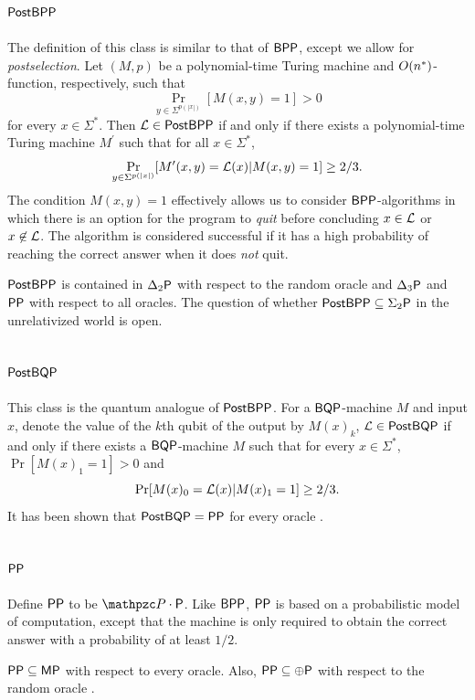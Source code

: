 \subsection{$\mathsf{PostBPP}$}

The definition of this class is similar to that of $\mathsf{BPP}$, except we allow 
for \textit{postselection}. Let $(M,p)$ be a polynomial-time Turing machine and 
$O(n^*)$-function, respectively,  such that
\[
\Pr_{y\in\Sigma^{p(|x|)}}[M(x,y)=1]>0
\]
for every $x\in\Sigma^*$. Then $\mathcal{L}\in\mathsf{PostBPP}$ if and only if there exists
a polynomial-time Turing machine $M^\prime$ such that for all $x\in\Sigma^*$,
\[
\Pr_{y\in\Sigma^{p(|x|)}}[M^\prime(x,y)=\mathcal{L}(x)|M(x,y)=1]\geq 2/3.
\]
The condition $M(x,y)=1$ effectively allows us to consider 
$\mathsf{BPP}$-algorithms in which there is an option for the program to 
\textit{quit} before concluding $x\in\mathcal{L}$ or $x\not\in\mathcal{L}$. The algorithm is 
considered successful if it has a high probability of reaching the correct 
answer when it does \textit{not} quit.

$\mathsf{PostBPP}$ is contained in $\Delta_2\mathsf{P}$ with respect to the random oracle 
and $\Delta_3\mathsf{P}$ and $\mathsf{PP}$ with respect to all oracles. The question of 
whether $\mathsf{PostBPP}\subseteq\Sigma_2\mathsf{P}$ in the unrelativized world is open.

\subsection{$\mathsf{PostBQP}$}

This class is the quantum analogue of $\mathsf{PostBPP}$. For a $\mathsf{BQP}$-machine
$M$ and input $x$, denote the value of the $k$th qubit of the output by 
$M(x)_k$, $\mathcal{L}\in\mathsf{PostBQP}$ if and only if there exists a 
$\mathsf{BQP}$-machine $M$ such that for every $x\in\Sigma^*$, $\Pr[M(x)_1=1]>0$ 
and
\[
\Pr[M(x)_0=\mathcal{L}(x)|M(x)_1=1]\geq 2/3.
\]
It has been shown that $\mathsf{PostBQP}=\mathsf{PP}$ for every oracle 
\cite{aaronson2005quantum}.

\subsection{$\mathsf{PP}$}

Define $\mathsf{PP}$ to be $\cP\cdot\sP$. Like $\mathsf{BPP}$, $\mathsf{PP}$ is based on 
a probabilistic model of computation, except that the machine is only required 
to obtain the correct answer with a probability of at least $1/2$.

$\mathsf{PP}\subseteq\mathsf{MP}$ with respect to every oracle. Also, 
$\mathsf{PP}\subseteq\oplus\mathsf{P}$ with respect to the random oracle \cite{Raz87b}.

